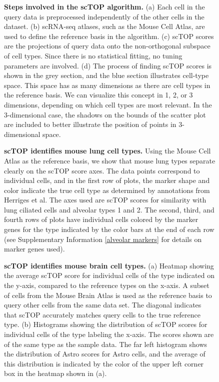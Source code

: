 \documentclass[vruler,JEB]{COB}%
\begin{document}
\newcommand{\newblock}{}


\begin{figure}[h!]
	\centering
	\caption{\textbf{Steps involved in the scTOP algorithm.} (a) Each cell in the query data is preprocessed independently of the other cells in the dataset. (b) scRNA-seq atlases, such as the Mouse Cell Atlas, are used to define the reference basis in the algorithm. (c) scTOP scores are the projections of query data onto the non-orthogonal subspace of cell types. Since there is no statistical fitting, no tuning parameters are involved. (d) The process of finding scTOP scores is shown in the grey section, and the blue section illustrates cell-type space. This space has as many dimensions as there are cell types in the reference basis. We can visualize this concept in 1, 2, or 3 dimensions, depending on which cell types are most relevant. In the 3-dimensional case, the shadows on the bounds of the scatter plot are included to better illustrate the position of points in 3-dimensional space.}
	\label{FIG:1}
\end{figure}

\begin{figure}[h!]
	\centering
	\caption{\textbf{scTOP identifies mouse lung cell types.} Using the Mouse Cell Atlas as the reference basis, we show that mouse lung types separate clearly on the scTOP score axes. The data points correspond to individual cells, and in the first row of plots, the marker shape and color indicate the true cell type as determined by annotations from Herriges et al. The axes used are scTOP scores for similarity with lung ciliated cells and alveolar types 1 and 2. The second, third, and fourth rows of plots have individual cells colored by the marker genes for the type indicated by the color bars at the end of each row (see Supplementary Information \ref{alveolar markers} for details on marker genes used).}
	\label{herriges}
\end{figure}

\begin{figure}[h!]
	\centering
	\caption{\textbf{scTOP identifies mouse brain cell types.} (a) Heatmap showing the average scTOP score for individual cells of the type indicated on the y-axis, compared to the reference types on the x-axis. A subset of cells from the Mouse Brain Atlas is used as the reference basis to query other cells from the same data set. The diagonal indicates that scTOP accurately matches query cells to the true reference type. (b) Histograms showing the distribution of scTOP scores for individual cells of the type labeling the x-axis. The scores shown are of the same type as the sample data. The far left histogram shows the distribution of Astro scores for Astro cells, and the average of this distribution is indicated by the color of the upper left corner box in the heatmap shown in (a).}
	\label{mouse_brain}
\end{figure}
\end{document}
